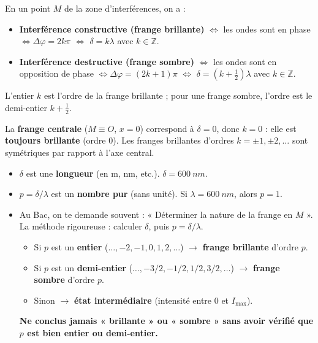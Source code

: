 \documentclass[11pt]{article}
\begin{document}
\begin{propriete}
En un point $M$ de la zone d'interférences, on a :
\begin{itemize}
  \item \textbf{Interférence constructive (frange brillante)} $\iff$ les ondes sont en phase $\iff \Delta\varphi = 2k\pi$ $\iff$ $\boxed{\delta = k\lambda}$ avec $k \in \mathbb{Z}$.
  \item \textbf{Interférence destructive (frange sombre)} $\iff$ les ondes sont en opposition de phase $\iff \Delta\varphi = (2k+1)\pi$ $\iff$ $\boxed{\delta = \left(k+\frac12\right)\lambda}$ avec $k \in \mathbb{Z}$.
\end{itemize}
L'entier $k$ est l'ordre de la frange brillante ; pour une frange sombre, l'ordre est le demi-entier $k+\frac12$.
\end{propriete}

La \textbf{frange centrale} ($M \equiv O$, $x=0$) correspond à $\delta = 0$, donc $k=0$ : elle est \textbf{toujours brillante} (ordre 0). Les franges brillantes d'ordres $k = \pm 1, \pm 2, \dots$ sont symétriques par rapport à l'axe central.

\begin{attention}
\begin{itemize}
  \item $\delta$ est une \textbf{longueur} (en $\text{m}$, $\text{nm}$, etc.). $\delta = \SI{600}{nm}$.
  \item $p = \delta/\lambda$ est un \textbf{nombre pur} (sans unité). Si $\lambda = \SI{600}{nm}$, alors $p = 1$.
  \item Au Bac, on te demande souvent : « Déterminer la nature de la frange en $M$ ». La méthode rigoureuse : calculer $\delta$, puis $p = \delta/\lambda$.
  \begin{itemize}
    \item Si $p$ est un \textbf{entier} ($\dots, -2, -1, 0, 1, 2, \dots$) $\rightarrow$ \textbf{frange brillante} d'ordre $p$.
    \item Si $p$ est un \textbf{demi-entier} ($\dots, -3/2, -1/2, 1/2, 3/2, \dots$) $\rightarrow$ \textbf{frange sombre} d'ordre $p$.
    \item Sinon $\rightarrow$ \textbf{état intermédiaire} (intensité entre $0$ et $I_{\max}$).
  \end{itemize}
  \textbf{Ne conclus jamais « brillante » ou « sombre » sans avoir vérifié que $p$ est bien entier ou demi-entier.}
\end{itemize}
\end{attention}
\end{document}
